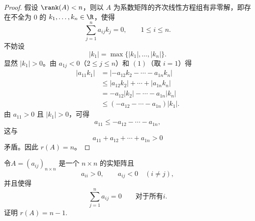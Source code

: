 \begin{proof}
	假设 $\rank(A)<n$，则以 $A$ 为系数矩阵的齐次线性方程组有非零解，即存在不全为 $0$ 的 $k_1,\ldots,k_n\in\R$，使得
	\begin{equation}\tag{1}
		\sum_{j=1}^n a_{ij}k_j=0,
		\qquad 1\leq i\leq n.
	\end{equation}
	不妨设
	\[
	|k_1|=\max\{|k_1|,\ldots,|k_n|\}.
	\]
	显然 $|k_1|>0$。由 $a_{1j}<0$（$2\leq j\leq n$）和 $(1)$（取 $i=1$）得
	\[
	\begin{aligned}
		|a_{11}k_1|
		&=|-a_{12}k_2-\cdots-a_{1n}k_n|\\
		&\leq |a_{12}k_2|+\cdots+|a_{1n}k_n|\\
		&=-a_{12}|k_2|-\cdots-a_{1n}|k_n|\\
		&\leq(-a_{12}-\cdots-a_{1n})|k_1|.
	\end{aligned}
	\]
	由 $a_{11}>0$ 且 $|k_1|>0$，可得
	\[
	a_{11}\leq-a_{12}-\cdots-a_{1n},
	\]
	这与
	\[
	a_{11}+a_{12}+\cdots+a_{1n}>0
	\]
	矛盾。因此 $r(A)=n$。
\end{proof}

\begin{problem}
	令$A=(a_{ij})_{n\times n}$ 是一个 $n\times n$ 的实矩阵且
	\[
	a_{ii}>0,\qquad a_{ij}<0\quad(i\neq j),
	\]
	并且使得
	\[
	\sum_{j=1}^n a_{ij}=0
	\qquad\text{对于所有}i.
	\]
	证明 $r(A)=n-1$.
\end{problem}

